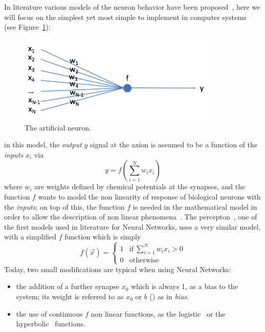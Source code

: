  In literature various models of the neuron behavior have been proposed~\cite{neuronbe1, neuronbe2, neuronbe3}, %
 here we will focus on the simplest yet most simple to implement in computer systems~\cite{artificialneuron} (see Figure~\ref{fig:artificialneuron}): %
 \begin{figure}[h]
     \centering
     \includegraphics[width=0.85\textwidth]{images/artificialneuron.png}
     \caption{The artificial neuron.}
     \label{fig:artificialneuron}
 \end{figure}
 in this model, the \emph{output} $y$ signal at the axion is assumed to be a function of the \emph{inputs} $x_i$ via
 \begin{equation}
   y = f(\sum_{i=1}^{N} w_i x_i)
   \label{eq:artificialneuron}
 \end{equation}
where $w_i$ are weights defined by chemical potentials at the synapses, and the function $f$ wants to model the non linearity of response of biological neurons with the \emph{inputs}; on top of this, the function $f$ is needed in the mathematical model in order to allow the description of non linear phenomena~\cite{nonlinearitytheorem}. The percepton~\cite{perceptron}, one of the first models used in literature for Neural Networks, uses a very similar model, with a simplified $f$ function which is simply
\begin{equation}
  f(\vec{x})= \begin{cases}
                1 &  \text{if}\  \sum_{i=1}^{N} w_i x_i >0 \\
                0 &  \text{otherwise}
              \end{cases}
\end{equation}
Today, two small modifications are typical when using Neural Networks:
\begin{itemize}
\item the addition of a further synapse $x_0$ which is always 1, as a bias to the system; its weight is referred to as $x_0$ or $b$ () as in \emph{bias}.
\item the use of continuous $f$ non linear functions, as the logistic~\cite{logistic} or the hyperbolic~\cite{hyperbolic} functions.
\end{itemize}

